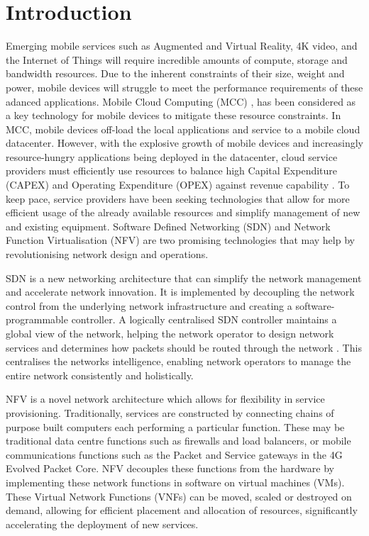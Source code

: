 
\section{Introduction}
\label{sec:introduction}

Emerging mobile services such as Augmented and Virtual Reality, 4K video, and the Internet of Things will require incredible amounts of compute, storage and bandwidth resources\cite{AndrewsBCHLSZ14}. Due to the inherent constraints of their size, weight and power, mobile devices will struggle to meet the performance requirements of these adanced applications. Mobile Cloud Computing (MCC) \cite{7809047}, \cite{7364240} has been considered as a key technology for mobile devices to mitigate these resource constraints. In MCC, mobile devices off-load the local applications and service to a mobile cloud datacenter. However, with the explosive growth of mobile devices and increasingly resource-hungry applications being deployed in the datacenter, cloud service providers must efficiently use resources to balance high Capital Expenditure (CAPEX) and Operating Expenditure (OPEX) against revenue capability \cite{VahdatAFMPR10}. To keep pace, service providers have been seeking technologies that allow for more efficient usage of the already available resources and simplify management of new and existing equipment. Software Defined Networking (SDN) and Network Function Virtualisation (NFV) are two promising technologies that may help by revolutionising network design and operations.

SDN is a new networking architecture that can simplify the network management and accelerate network innovation. It is implemented by decoupling the network control from the underlying network infrastructure and creating a software-programmable controller. A logically centralised SDN controller maintains a global view of the network, helping the network operator to design network services and determines how packets should be routed through the network \cite{KimF13,HaresW13}. This centralises the networks intelligence, enabling network operators to manage the entire network consistently and holistically. 

NFV is a novel network architecture which allows for flexibility in service provisioning. Traditionally, services are constructed by connecting chains of purpose built computers each performing a particular function. These may be traditional data centre functions such as firewalls and load balancers, or mobile communications functions such as the Packet and Service gateways in the 4G Evolved Packet Core. NFV decouples these functions from the hardware by implementing these network functions in software on virtual machines (VMs). These Virtual Network Functions (VNFs) can be moved, scaled or destroyed on demand, allowing for efficient placement and allocation of resources, significantly accelerating the deployment of new services. 

